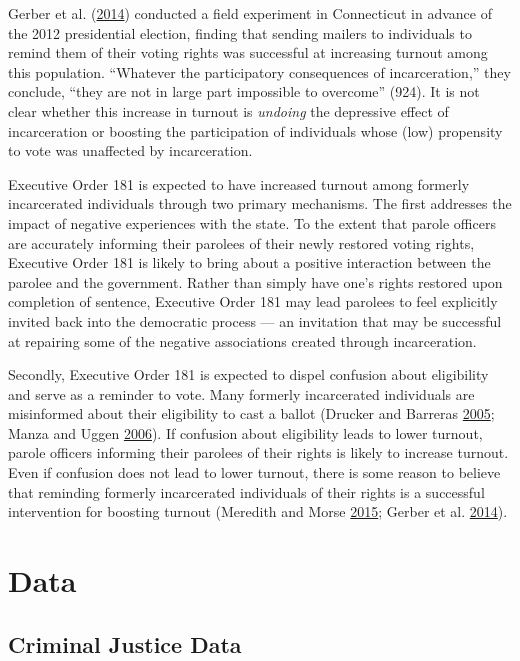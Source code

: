 \documentclass[]{article}
\begin{document}
Gerber et al. (\protect\hyperlink{ref-Gerber2014}{2014}) conducted a field experiment in Connecticut in advance of the 2012 presidential election, finding that sending mailers to individuals to remind them of their voting rights was successful at increasing turnout among this population. ``Whatever the participatory consequences of incarceration,'' they conclude, ``they are not in large part impossible to overcome'' (924). It is not clear whether this increase in turnout is \emph{undoing} the depressive effect of incarceration or boosting the participation of individuals whose (low) propensity to vote was unaffected by incarceration.

Executive Order 181 is expected to have increased turnout among formerly incarcerated individuals through two primary mechanisms. The first addresses the impact of negative experiences with the state. To the extent that parole officers are accurately informing their parolees of their newly restored voting rights, Executive Order 181 is likely to bring about a positive interaction between the parolee and the government. Rather than simply have one's rights restored upon completion of sentence, Executive Order 181 may lead parolees to feel explicitly invited back into the democratic process --- an invitation that may be successful at repairing some of the negative associations created through incarceration.

Secondly, Executive Order 181 is expected to dispel confusion about eligibility and serve as a reminder to vote. Many formerly incarcerated individuals are misinformed about their eligibility to cast a ballot (Drucker and Barreras \protect\hyperlink{ref-Drucker2005}{2005}; Manza and Uggen \protect\hyperlink{ref-locked_out}{2006}). If confusion about eligibility leads to lower turnout, parole officers informing their parolees of their rights is likely to increase turnout. Even if confusion does not lead to lower turnout, there is some reason to believe that reminding formerly incarcerated individuals of their rights is a successful intervention for boosting turnout (Meredith and Morse \protect\hyperlink{ref-Meredith2015}{2015}; Gerber et al. \protect\hyperlink{ref-Gerber2014}{2014}).

\hypertarget{data}{%
\section{Data}\label{data}}

\hypertarget{criminal-justice-data}{%
\subsection*{Criminal Justice Data}\label{criminal-justice-data}}
\end{document}
